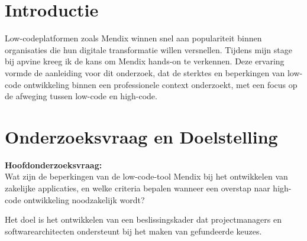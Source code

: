 \documentclass[a0,portrait]{hogent-poster}
\begin{document}
    \begin{multicols}{2}
        
        \section{Introductie}
        Low-codeplatformen zoals Mendix winnen snel aan populariteit binnen organisaties die hun digitale transformatie willen versnellen. Tijdens mijn stage bij apvine kreeg ik de kans om Mendix hands-on te verkennen. Deze ervaring vormde de aanleiding voor dit onderzoek, dat de sterktes en beperkingen van low-code ontwikkeling binnen een professionele context onderzoekt, met een focus op de afweging tussen low-code en high-code.
        
        \section{Onderzoeksvraag en Doelstelling}
        
        \textbf{Hoofdonderzoeksvraag:} \\
        Wat zijn de beperkingen van de low-code-tool Mendix bij het ontwikkelen van zakelijke applicaties, en welke criteria bepalen wanneer een overstap naar high-code ontwikkeling noodzakelijk wordt?
        
        Het doel is het ontwikkelen van een beslissingskader dat projectmanagers en softwarearchitecten ondersteunt bij het maken van gefundeerde keuzes.
        

\end{multicols}
\end{document}
